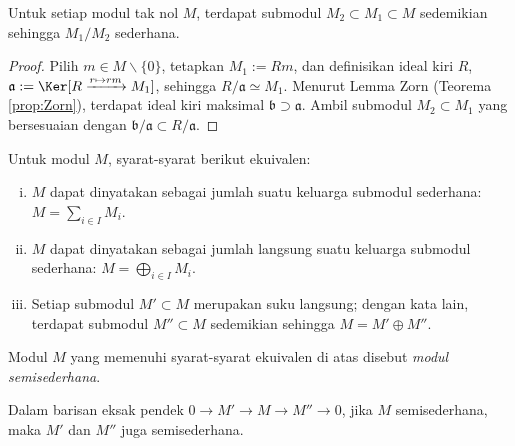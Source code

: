 \begin{lemma}\label{prop:existence-simple-subquotient}
	Untuk setiap modul tak nol $M$, terdapat submodul $M_2 \subset M_1 \subset M$ sedemikian sehingga $M_1/M_2$ sederhana.
\end{lemma}
\begin{proof}
	Pilih $m \in M \smallsetminus \{0\}$, tetapkan $M_1 := Rm$, dan definisikan ideal kiri $R$, $\mathfrak{a} := \Ker[R \xrightarrow{r \mapsto rm} M_1]$, sehingga $R/\mathfrak{a} \simeq M_1$. Menurut Lemma Zorn (Teorema \ref{prop:Zorn}), terdapat ideal kiri maksimal $\mathfrak{b} \supset \mathfrak{a}$. Ambil submodul $M_2 \subset M_1$ yang bersesuaian dengan $\mathfrak{b}/\mathfrak{a} \subset R/\mathfrak{a}$.
\end{proof}

\begin{proposition}
	Untuk modul $M$, syarat-syarat berikut ekuivalen:
	\begin{enumerate}[(i)]
		\item $M$ dapat dinyatakan sebagai jumlah suatu keluarga submodul sederhana: $M = \sum_{i \in I} M_i$.
		\item $M$ dapat dinyatakan sebagai jumlah langsung suatu keluarga submodul sederhana: $M = \bigoplus_{i \in I} M_i$.
		\item Setiap submodul $M' \subset M$ merupakan suku langsung; dengan kata lain, terdapat submodul $M'' \subset M$ sedemikian sehingga $M = M' \oplus M''$.
	\end{enumerate}
	Modul $M$ yang memenuhi syarat-syarat ekuivalen di atas disebut \emph{modul semisederhana}.
	
	Dalam barisan eksak pendek $0 \to M' \to M \to M'' \to 0$, jika $M$ semisederhana, maka $M'$ dan $M''$ juga semisederhana.
\end{proposition}
